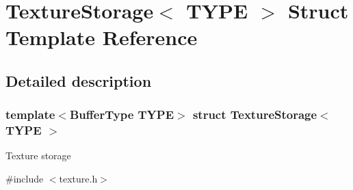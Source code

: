 \hypertarget{struct_texture_storage}{}\section{Texture\+Storage$<$ T\+Y\+PE $>$ Struct Template Reference}
\label{struct_texture_storage}


\subsection{Detailed description}
\subsubsection*{template$<$Buffer\+Type T\+Y\+PE$>$\newline
struct Texture\+Storage$<$ T\+Y\+P\+E $>$}

Texture storage

\label{struct_texture_storage_TextureStorage}%
%


{\ttfamily \#include $<$texture.\+h$>$}

